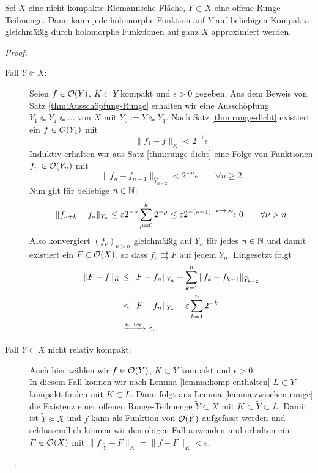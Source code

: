 \begin{thm}
  \label{thm:runge}
  Sei $X$ eine nicht kompakte Riemannsche Fläche, $Y \subset X$ eine
  offene Runge-Teilmenge.
  Dann kann jede holomorphe Funktion auf $Y$ auf beliebigen Kompakta
  gleichmäßig durch holomorphe Funktionen auf ganz $X$ approximiert werden.
\end{thm}

\begin{proof}
  \begin{description}
  \item[Fall $Y \Subset X$:] Seien $f \in \mathcal{O}(Y)$, $K \subset Y$
    kompakt und $\epsilon > 0$ gegeben. 
    Aus dem Beweis von Satz \ref{thm:Ausschöpfung-Runge} erhalten wir
    eine Ausschöpfung$Y_1
    \Subset Y_2 \Subset \dots$ von $X$ mit $Y_0 := Y \Subset Y_1$. 
    Nach Satz \ref{thm:runge-dicht} existiert ein $f \in \mathcal{O}(Y_1)$
    mit
    \[
    \|f_1 - f\|_K < 2^{-1} \epsilon
    \]
    Induktiv erhalten wir aus Satz \ref{thm:runge-dicht} eine Folge
    von Funktionen $f_n \in \mathcal{O}(Y_n)$ mit
    \[
    \|f_n - f_{n-1}\|_{\bar Y_{n-2}} < 2^{-n} \epsilon \qquad \forall
    n \geq 2
    \]
    Nun gilt für beliebige $n \in \mathbb{N}$:
    \[
    \|f_{\nu + k} - f_{\nu} \|_{Y_n} \leq \varepsilon 2^{-\nu} \sum_{\mu
      = 0}^k 2^{-\mu} \leq  \varepsilon 2^{-(\nu+1)} \xrightarrow{\nu \rightarrow
      \infty} 0 \qquad \forall \nu > n
    \]
    Also konvergiert $(f_\nu)_{\nu > n}$ gleichmäßig auf $Y_n$ für
    jedes $n \in \mathbb{N}$ und damit existiert ein $F \in \mathcal{O}(X)$, so dass
    $f_\nu \rightrightarrows F$ auf jedem $Y_n$. Eingesetzt folgt
    \begin{align*}
      \|F - f\|_K & \leq \|F - f_n\|_{Y_n} + \sum_{k=1}^n \|f_k -
      f_{k-1}\|_{\bar Y_{k-2}} \\
      & < \|F - f_n \|_{Y_n} + \varepsilon \sum_{k=1}^n 2^{-k} \\
      & \xrightarrow{n \rightarrow \infty} \varepsilon.
    \end{align*}
  \item[Fall $Y \subset X$ nicht relativ kompakt:] Auch hier wählen
    wir $f \in \mathcal{O}(Y)$, $K \subset Y$ kompakt und $\epsilon > 0$. \\
    In diesem Fall können wir nach Lemma \ref{lemma:komp-enthalten}  $L \subset Y$ kompakt finden mit $K \subset
    \mathring L$. Dann folgt aus Lemma \ref{lemma:zwischen-runge} die Existenz einer
    offenen Runge-Teilmenge
    $\tilde Y \subset X$ mit $K \subset \tilde Y \subset L$. 
    Damit ist $\tilde Y \Subset X$ und $f$ kann als Funktion von
    $\mathcal{O}(\tilde Y)$ aufgefasst werden und schlussendlich können wir
    den obigen Fall anwenden und erhalten ein $F \in \mathcal{O}(X)$ mit
    $\|f|_{\tilde Y} - F\|_K = \|f - F\|_K < \epsilon$.
  \end{description}
\end{proof}

